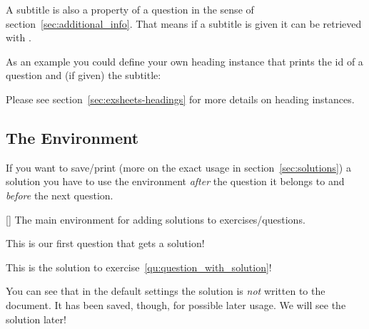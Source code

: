 \documentclass[load-preamble+]{cnltx-doc}
\begin{document}
A subtitle is also a property of a question in the sense of
section~\ref{sec:additional_info}.  That means if a subtitle is given it can
be retrieved with .

As an example you could define your own heading instance that prints the
\acs{id} of a question and (if given) the subtitle:

\begin{sourcecode}
\end{sourcecode}

Please see section~\ref{sec:exsheets-headings} for more details on heading
instances.

\subsection{The  Environment}
If you want to save/print (more on the exact usage in
section~\ref{sec:solutions}) a solution you have to use the 
environment \emph{after} the question it belongs to and \emph{before} the next
question.
\begin{environments}
  []
    The main environment for adding solutions to exercises/questions.
\end{environments}
\begin{example}
  \begin{question}[ID=first]\label{qu:question_with_solution}
    This is our first question that gets a solution!
  \end{question}
  \begin{solution}
    This is the solution to exercise~\ref{qu:question_with_solution}!
  \end{solution}
\end{example}
You can see that in the default settings the solution is \emph{not} written to
the document.  It has been saved, though, for possible later usage.  We will
see the solution later!
\end{document}
